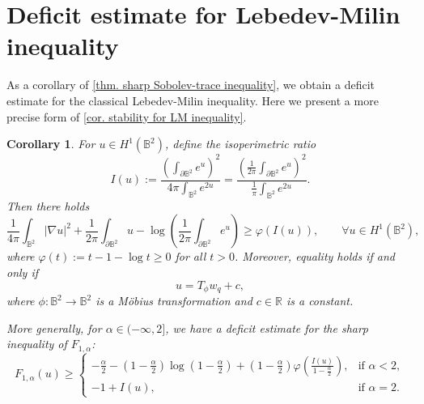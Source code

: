 \documentclass[11pt,a4paper,twoside]{amsart}
\newtheorem{corollary}[theorem]{Corollary}
\newtheorem{sketch proof}{Sketch of the proof}[section]
\begin{document}
    \section{Deficit estimate for Lebedev-Milin inequality}
    \label{sec. stability ineq for LM ineq}
    As a corollary of \cref{thm. sharp Sobolev-trace inequality}, we obtain a deficit estimate for the classical Lebedev-Milin inequality.
    Here we present a more precise form of \cref{cor. stability for LM inequality}.
    \begin{corollary}
    \label{cor. stability inequality}
       For $u\in H^1(\mathbb{B}^2)$, define the isoperimetric ratio
       \[
       I(u):=
       \frac{\left(
       \int_{\partial\mathbb{B}^2}e^{u}
       \right)^2}
       {4\pi\int_{\mathbb{B}^2}e^{2u}}
       =\frac{\left(\frac{1}{2\pi}
        \int_{\partial\mathbb{B}^2}e^{u}
        \right)^2}
        {\frac{1}{\pi}
        \int_{\mathbb{B}^2}e^{2u}}.
       \]
       Then there holds
       \begin{equation}\label{eq. stability of Lebedev-Milin inequality}
           \frac{1}{4\pi}
        \int_{\mathbb{B}^2}|\nabla u|^2
        +\frac{1}{2\pi}
        \int_{\partial \mathbb{B}^2}u
        -\log\left(
        \frac{1}{2\pi}
        \int_{\partial\mathbb{B}^2}e^{u}
        \right)
        \geq \varphi(I(u)), \qquad \forall u\in H^1(\mathbb{B}^2),
       \end{equation}
       where $\varphi(t):=t-1-\log t\geq0$ for all $t>0$.
       Moreover, equality holds if and only if 
       \begin{equation}
       \label{eq. minimizer in sharp LM inequality}
           u=T_\phi w_q+c,
       \end{equation}
       where $\phi:\mathbb{B}^2\to \mathbb{B}^2$ is a M\"obius transformation and $c\in\mathbb{R}$ is a constant.

       More generally, for $\alpha\in(-\infty,2]$, we have a deficit estimate for the sharp inequality of $F_{1,\alpha}$:
       \[
       F_{1,\alpha}(u) 
       \geq 
       \begin{cases}
           -\frac{\alpha}{2}
        -\left(1-\frac{\alpha}{2}\right)
        \log\left(1-\frac{\alpha}{2}\right)
        +\left(1-\frac{\alpha}{2}\right)
        \varphi\left(\frac{I(u)}{1-\frac{\alpha}{2}}\right), &\text{if }\alpha<2,\\
        -1+I(u), &\text{if }\alpha=2.
       \end{cases}
       \]
    \end{corollary}
\end{document}
